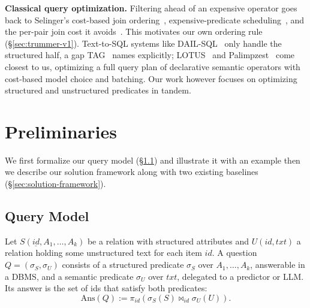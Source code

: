 \documentclass[sigconf]{acmart}
\begin{document}
\textbf{Classical query optimization.} Filtering ahead of an expensive operator goes back to Selinger's cost-based join ordering~\cite{selinger1979access}, expensive-predicate scheduling~\cite{hellerstein1993predicate,hellerstein1998optimization,chaudhuri1996optimization}, and the per-pair join cost it avoids~\cite{mishra1992join}. This motivates our own ordering rule (\S\ref{sec:trummer-v1}). Text-to-SQL systems like DAIL-SQL~\cite{gao2023textosql} only handle the structured half, a gap TAG~\cite{biswal2024tag} names explicitly; LOTUS~\cite{patel2024lotus} and Palimpzest~\cite{liu2024palimpzest} come closest to us, optimizing a full query plan of declarative semantic operators with cost-based model choice and batching. Our work however focuses on optimizing structured and unstructured predicates in tandem.


\section{Preliminaries}
\label{sec:preliminaries}

We first formalize our query model (\S\ref{sec:query-model}) and illustrate it with an example then we describe our solution framework along with two existing baselines (\S\ref{sec:solution-framework}).


\subsection{Query Model}
\label{sec:query-model}

Let $S(\underline{\mathit{id}}, A_1,\dots,A_k)$ be a relation with structured attributes and
$U(\mathit{id}, \mathit{txt})$ a relation holding some unstructured text for each item $\mathit{id}$.
A question $Q = (\sigma_S,\sigma_U)$ consists of a structured predicate $\sigma_S$ over $A_1,\dots,A_k$, answerable in a DBMS, and a semantic
predicate $\sigma_U$ over $\mathit{txt}$, delegated to a predictor or LLM. Its answer is the set of ids that satisfy both predicates:
\[ \mathrm{Ans}(Q) := \pi_{\mathit{id}}\left(\sigma_S(S) \bowtie_{\mathit{id}} \sigma_U(U)\right). \]


\end{document}
